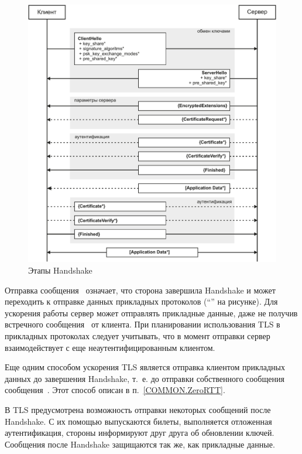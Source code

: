 \begin{figure}[hbt]
\begin{center}
\includegraphics[width=15cm]{../figs/Phases}
\end{center}
\caption{Этапы Handshake}\label{Fig.COMMON.Phases}
\end{figure}

Отправка сообщения~ означает, что сторона завершила
Handshake и может переходить к отправке данных прикладных протоколов
(``'' на рисунке). Для ускорения работы сервер может
отправлять прикладные данные, даже не получив встречного
сообщения~ от клиента. При планировании использования TLS 
в прикладных протоколах следует учитывать, что в момент отправки сервер
взаимодействует с еще неаутентифицированным клиентом.

Еще одним способом ускорения TLS является отправка клиентом прикладных данных до
завершения Handshake, т.~е. до отправки собственного сообщения
сообщения~. Этот способ описан в
п.~\ref{COMMON.ZeroRTT}.

В TLS предусмотрена возможность отправки некоторых сообщений после Handshake. 
С их помощью выпускаются билеты, выполняется отложенная аутентификация, 
стороны информируют друг друга об обновлении ключей. Сообщения после Handshake 
защищаются так же, как прикладные данные.

